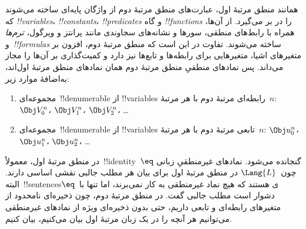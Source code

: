 \documentclass[../../../include/open-logic-section]{subfiles}
\begin{document}


همانند منطق مرتبهٔ اول، عبارت‌های منطق مرتبهٔ دوم از واژگان پایه‌ای ساخته
می‌شوند که \emph{!!{variable}s}، \emph{!!{constant}s}،
\emph{!!{predicate}s} و گاه \emph{!!{function}s} را در بر می‌گیرد. از
آن‌ها، همراه با رابط‌های منطقی، سورها و نشانه‌های سجاوندی مانند پرانتز و
ویرگول، \emph{ترم‌ها} و~\emph{!!{formula}s} ساخته می‌شوند. تفاوت در این
است که منطق مرتبهٔ دوم، افزون بر متغیرهای اشیا، متغیرهایی برای رابطه‌ها و
تابع‌ها نیز دارد و کمیت‌گذاری بر آن‌ها را مجاز می‌داند. پس نمادهای منطقیِ
منطق مرتبهٔ دوم همان نمادهای منطق مرتبهٔ اول‌اند، به‌اضافهٔ موارد زیر:

\begin{enumerate}
\item مجموعه‌ای~!!{denumerable} از !!{variable}s رابطه‌ای مرتبهٔ دوم
  با هر مرتبهٔ~$n$: $\Obj V_0^n$، $\Obj V_1^n$، $\Obj V_2^n$، \dots
\item مجموعه‌ای~!!{denumerable} از !!{variable}s تابعی مرتبهٔ دوم
  با هر مرتبهٔ~$n$: $\Obj u_0^n$، $\Obj u_1^n$، $\Obj u_2^n$، \dots
\end{enumerate}

در منطق مرتبهٔ اول، معمولاً~!!{identity}~$\eq$ گنجانده می‌شود. نمادهای
غیرمنطقیِ زبانی چون~$\Lang{L}$ در منطق مرتبهٔ اول برای بیان هر مطلب
جالبی نقشی اساسی دارند. البته~!!{sentence}sی هستند که هیچ نماد غیرمنطقی
به کار نمی‌برند، اما تنها با~$\eq$ دشوار است مطلب جالبی گفت. در منطق
مرتبهٔ دوم، چون ذخیره‌ای نامحدود از متغیرهای رابطه‌ای و تابعی داریم، حتی
بدون ذخیره‌ای ویژه از نمادهای غیرمنطقی می‌توانیم هر آنچه را در یک زبان
مرتبهٔ اول بیان می‌کنیم، بیان کنیم.
\end{document}
